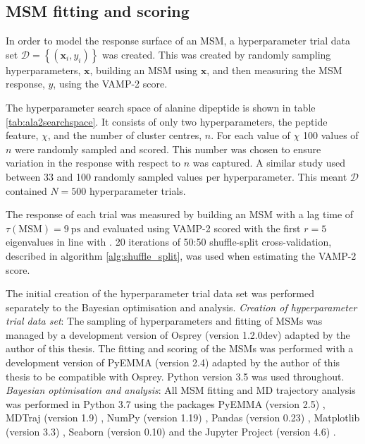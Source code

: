 \subsection{MSM fitting and scoring}\label{subsec:msm_fitting}
In order to  model the response surface of an MSM, a hyperparameter trial data set  $\mathcal{D} = \left\{ (\mathbf{x}_{i}, y_{i}) \right\}$ was created. This was created by  randomly sampling hyperparameters, $\mathbf{x}$, building an MSM using $\mathbf{x}$, and then measuring the MSM response, $y$, using the VAMP-2 score. 

The hyperparameter search space of alanine dipeptide is shown in table \ref{tab:ala2searchspace}. It consists of only two hyperparameters, the peptide feature, $\chi$, and the number of cluster centres, $n$.  For each value of $\chi$ \num{100} values of $n$ were randomly sampled and scored. This number was chosen to ensure variation in the response with respect to $n$ was captured. A similar study \cite{husicOptimizedParameterSelection2016} used between \num{33} and \num{100} randomly sampled values per hyperparameter. This meant $\mathcal{D}$ contained $N=500$ hyperparameter trials.  

The response of each trial was measured by building an MSM with a lag time of $\tau(\mathrm{MSM}) = \SI{9}{\pico\second}$ and evaluated using VAMP-2 scored with the first $r=5$ eigenvalues in line with \cite{bowmanQuantitativeComparisonAlternative2013}. \num{20} iterations of 50:50 shuffle-split cross-validation, described in algorithm \ref{alg:shuffle_split}, was used when estimating the VAMP-2 score. 

The initial creation of the hyperparameter trial data set was performed separately to the Bayesian optimisation and analysis. \emph{Creation of hyperparameter trial data set}: The sampling of hyperparameters and fitting of MSMs was managed by a development version of Osprey (version 1.2.0dev) \cite{mcgibbonOspreyHyperparameterOptimization2016} adapted by the author of this thesis. The fitting and scoring of the MSMs was performed with a development version of PyEMMA (version 2.4) \cite{schererPyEMMASoftwarePackage2015a} adapted by the author of this thesis to be compatible with Osprey. Python version 3.5 was used throughout. \emph{Bayesian optimisation and analysis}:
All MSM fitting and MD trajectory analysis was performed in Python 3.7 using the packages PyEMMA (version 2.5) \cite{schererPyEMMASoftwarePackage2015a}, MDTraj (version 1.9) \cite{mcgibbonMDTrajModernOpen2015}, NumPy (version 1.19) \cite{waltNumPyArrayStructure2011}, Pandas (version 0.23) \cite{mckinneyPandasFoundationalPython2011}, Matplotlib (version 3.3) \cite{hunterMatplotlib2DGraphics2007},  Seaborn (version 0.10) \cite{michaelwaskomMwaskomSeabornV02020} and the Jupyter Project (version 4.6) \cite{kluyverJupyterNotebooksPublishing2016}.

